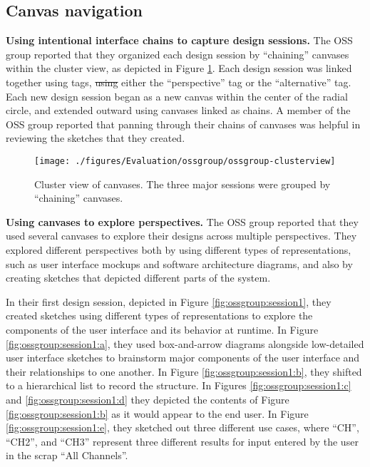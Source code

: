 \documentclass[12pt,fleqn]{ucithesis}
\providecommand{\DIFaddtex}[1]{{\protect\color{blue}\uwave{#1}}} %
\providecommand{\DIFdeltex}[1]{{\protect\color{red}\sout{#1}}}                      %
\providecommand{\DIFaddbegin}{} %
\providecommand{\DIFaddend}{} %
\providecommand{\DIFdelbegin}{} %
\providecommand{\DIFdelend}{} %
\providecommand{\DIFadd}[1]{\texorpdfstring{\DIFaddtex{#1}}{#1}} %
\providecommand{\DIFdel}[1]{\texorpdfstring{\DIFdeltex{#1}}{}} %
\begin{document}
\subsection{Canvas navigation}

\textbf{Using intentional interface chains to capture design sessions.} The OSS group reported that they organized each design session by ``chaining'' canvases within the cluster view, as depicted in Figure \ref{fig:ossgroup:clusterview}. Each design session was linked together using tags, \DIFdelbegin \DIFdel{using }\DIFdelend \DIFaddbegin \DIFadd{typically with }\DIFaddend either the ``perspective'' tag or the ``alternative'' tag. Each new design session began as a new canvas within the center of the radial circle, and extended outward using canvases linked as chains. A member of the OSS group reported that panning through their chains of canvases was helpful in reviewing the sketches that they created.

\begin{figure}%
  \centering
  \texttt{[image: ./figures/Evaluation/ossgroup/ossgroup-clusterview]}
   \caption {Cluster view of canvases. The three major sessions were grouped by ``chaining'' canvases.}
   \label{fig:ossgroup:clusterview}   
\end{figure}%

\textbf{Using canvases to explore perspectives.} The OSS group reported that they used several canvases to explore their designs across multiple perspectives. They explored different perspectives both by using different types of representations, such as user interface mockups and software architecture diagrams, and also by creating sketches that depicted different parts of the system. 

In their first design session, depicted in Figure \ref{fig:ossgroup:session1}, they created sketches using different types of representations to explore the components of the user interface and its behavior at runtime. In Figure \ref{fig:ossgroup:session1:a}, they used box-and-arrow diagrams alongside low-detailed user interface sketches to brainstorm major components of the user interface and their relationships to one another. In Figure \ref{fig:ossgroup:session1:b}, they shifted to a hierarchical list to record the structure. In Figures \ref{fig:ossgroup:session1:c} and \ref{fig:ossgroup:session1:d} they depicted the contents of Figure \ref{fig:ossgroup:session1:b} as it would appear to the end user. In Figure \ref{fig:ossgroup:session1:e}, they sketched out three different use cases, where ``CH'', ``CH2'', and ``CH3'' represent three different results for input entered by the user in the scrap ``All Channels''.
\end{document}
